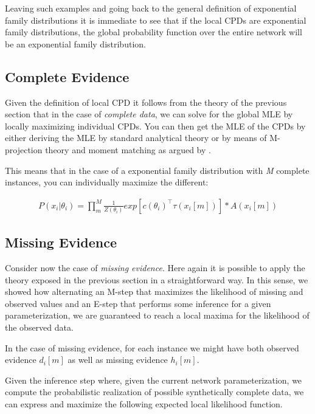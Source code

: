 \documentclass[11pt]{article}
\begin{document}
\begin{article}
Leaving such examples and going back to the general definition of
exponential family distributions it is immediate to see that if
the local CPDs are exponential family distributions, the global
probability function over the entire network will be an
exponential family distribution.

\subsection{Complete Evidence}
\label{sec:orge6a73c7}

Given the definition of local CPD it follows from the theory of the
previous section that in the case of \emph{complete data}, we can solve
for the global MLE by locally maximizing individual CPDs. You can
then get the MLE of the CPDs by either deriving the MLE by standard
analytical theory or by means of M-projection theory and moment
matching as argued by \cite{koller2009probabilistic}.

This means that in the case of a exponential family distribution
with \emph{M} complete instances, you can individually maximize the different:

\begin{align} \label{eq:exponential-family-likelihood}
P(x_i|\theta_i) = \prod_m^M \frac{1}{Z(\theta_i)} exp[c(\theta_i)^\intercal \tau(x_i[m])] * A(x_i[m]) 
\end{align}


\subsection{Missing Evidence}
\label{sec:org02eb392}

Consider now the case of \emph{missing evidence}. Here again it is
possible to apply the theory exposed in the previous section in a
straightforward way. In this sense, we showed how alternating an
M-step that maximizes the likelihood of missing and observed values
and an E-step that performs some inference for a given
parameterization, we are guaranteed to reach a local maxima for
the likelihood of the observed data.

In the case of missing evidence, for each instance we might have
both observed evidence \(d_i[m]\) as well as missing evidence \(h_i[m]\).

Given the inference step where, given the current network
parameterization, we compute the probabilistic realization of
possible synthetically complete data, we can express and maximize
the following expected local likelihood function.


\end{article}
\end{document}
